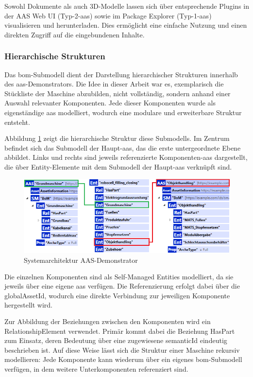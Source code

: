 Sowohl Dokumente als auch 3D-Modelle lassen sich über entsprechende Plugins in der AAS Web UI (Typ-2-\acs{aas}) sowie im Package Explorer (Typ-1-\acs{aas}) visualisieren und herunterladen.
Dies ermöglicht eine einfache Nutzung und einen direkten Zugriff auf die eingebundenen Inhalte.

\subsubsection*{Hierarchische Strukturen}
\vspace{-0.5em}
Das \acs{bom}-Submodell dient der Darstellung hierarchischer Strukturen innerhalb des \acs{aas}-Demonstrators.
Die Idee in dieser Arbeit war es, exemplarisch die Stückliste der Maschine abzubilden, nicht vollständig, sondern anhand einer Auswahl relevanter Komponenten.
Jede dieser Komponenten wurde als eigenständige \acs{aas} modelliert, wodurch eine modulare und erweiterbare Struktur entsteht.

Abbildung \ref{fig:BOM} zeigt die hierarchische Struktur diese Submodells.
Im Zentrum befindet sich das Submodell der Haupt-\acs{aas}, das die erste untergeordnete Ebene abbildet.
Links und rechts sind jeweils referenzierte Komponenten-\acs{aas} dargestellt, die über Entity-Elemente mit dem Submodell der Haupt-\acs{aas} verknüpft sind.

\begin{figure}[htbp]
    \centering
        \includegraphics[width=1\textwidth]{Bilder/Ergebnisse/StatischeDaten/BOM.png}
    \caption{Systemarchitektur AAS-Demonstrator}
    \label{fig:BOM}
\end{figure}

Die einzelnen Komponenten sind als Self-Managed Entities modelliert, da sie jeweils über eine eigene \acs{aas} verfügen.
Die Referenzierung erfolgt dabei über die globalAssetId, wodurch eine direkte Verbindung zur jeweiligen Komponente hergestellt wird.

Zur Abbildung der Beziehungen zwischen den Komponenten wird ein RelationshipElement verwendet.
Primär kommt dabei die Beziehung HasPart zum Einsatz, deren Bedeutung über eine zugewiesene semanticId eindeutig beschrieben ist.
Auf diese Weise lässt sich die Struktur einer Maschine rekursiv modellieren: Jede Komponente kann wiederum über ein eigenes \acs{bom}-Submodell verfügen, in dem weitere Unterkomponenten referenziert sind.

